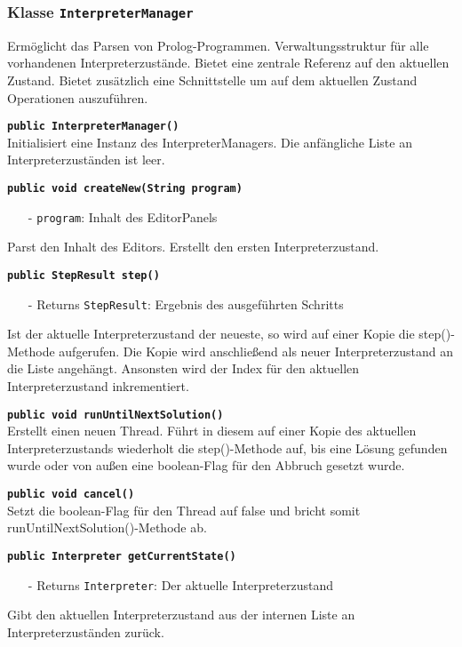 \documentclass[parskip=full,11pt,twoside]{scrartcl}
\begin{document}
\subsubsection{Klasse \texttt{InterpreterManager}}

Ermöglicht das Parsen von Prolog-Programmen. Verwaltungsstruktur für alle vorhandenen Interpreterzustände. Bietet eine zentrale Referenz auf den aktuellen Zustand. Bietet zusätzlich eine Schnittstelle um auf dem aktuellen Zustand Operationen auszuführen.

\textbf{\texttt{public InterpreterManager()}}\\
Initialisiert eine Instanz des InterpreterManagers. Die anfängliche Liste an Interpreterzuständen ist leer.

\textbf{\texttt{public void createNew(String program)}}
\begin{itemize}[noitemsep]
	\item[-] \texttt{program}: Inhalt des EditorPanels
\end{itemize}
Parst den Inhalt des Editors. Erstellt den ersten Interpreterzustand.

\textbf{\texttt{public StepResult step()}}
\begin{itemize}[noitemsep]
    \item[-] Returns \texttt{StepResult}: Ergebnis des ausgeführten Schritts
\end{itemize}
Ist der aktuelle Interpreterzustand der neueste, so wird auf einer Kopie die step()-Methode aufgerufen. Die Kopie wird anschließend als neuer Interpreterzustand an die Liste angehängt. Ansonsten wird der Index für den aktuellen Interpreterzustand inkrementiert.

\textbf{\texttt{public void runUntilNextSolution()}}\\
Erstellt einen neuen Thread. Führt in diesem auf einer Kopie des aktuellen Interpreterzustands wiederholt die step()-Methode auf, bis eine Lösung gefunden wurde oder von außen eine boolean-Flag für den Abbruch gesetzt wurde.

\textbf{\texttt{public void cancel()}}\\
Setzt die boolean-Flag für den Thread auf false und bricht somit runUntilNextSolution()-Methode ab. 

\textbf{\texttt{public Interpreter getCurrentState()}}
\begin{itemize}[noitemsep]
    \item[-] Returns \texttt{Interpreter}: Der aktuelle Interpreterzustand
\end{itemize}
Gibt den aktuellen Interpreterzustand aus der internen Liste an Interpreterzuständen zurück.
\end{document}
